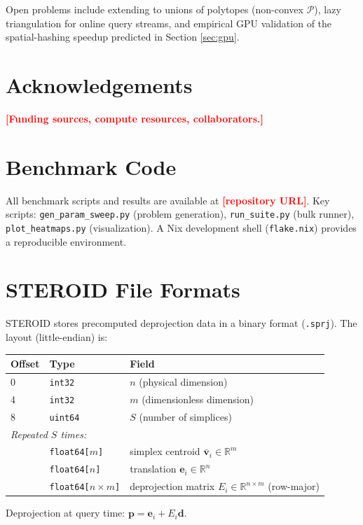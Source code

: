 \documentclass[review,onefignum,onetabnum]{./SIAM_template/siamart171218}
\newcommand{\note}[1]{\textcolor{red}{\textbf{[#1]}}}
\begin{document}
Open problems include extending to unions of polytopes (non-convex $\mathcal{P}$),
lazy triangulation for online query streams, and empirical GPU validation of the
spatial-hashing speedup predicted in Section \ref{sec:gpu}.

\section*{Acknowledgements}
\note{Funding sources, compute resources, collaborators.}

\appendix

\section{Benchmark Code}
\label{app:code}

All benchmark scripts and results are available at \note{repository URL}.
Key scripts:
\texttt{gen\_param\_sweep.py} (problem generation),
\texttt{run\_suite.py} (bulk runner),
\texttt{plot\_heatmaps.py} (visualization).
A Nix development shell (\texttt{flake.nix}) provides a reproducible environment.

\section{STEROID File Formats}
\label{app:formats}

STEROID stores precomputed deprojection data in a binary format (\texttt{.sprj}).
The layout (little-endian) is:

\begin{center}
	\begin{tabular}{lll}
		\toprule
		Offset & Type                           & Field                                                             \\
		\midrule
		0      & \texttt{int32}                 & $n$ (physical dimension)                                          \\
		4      & \texttt{int32}                 & $m$ (dimensionless dimension)                                     \\
		8      & \texttt{uint64}                & $S$ (number of simplices)                                         \\
		\midrule
		\multicolumn{3}{l}{\emph{Repeated $S$ times:}}                                                              \\
		       & \texttt{float64[$m$]}          & simplex centroid $\bar{\mathbf{v}}_i \in \mathbb{R}^m$            \\
		       & \texttt{float64[$n$]}          & translation $\mathbf{e}_i \in \mathbb{R}^n$                       \\
		       & \texttt{float64[$n \times m$]} & deprojection matrix $E_i \in \mathbb{R}^{n \times m}$ (row-major) \\
		\bottomrule
	\end{tabular}
\end{center}

Deprojection at query time: $\mathbf{p} = \mathbf{e}_i + E_i \mathbf{d}$.

\listofchanges

\printbibliography
\end{document}
